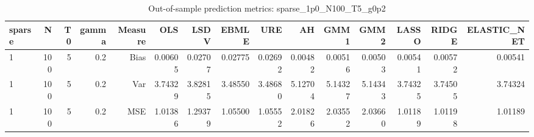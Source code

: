 \begin{table}[!htbp]\centering
\caption{Out-of-sample prediction metrics: sparse_1p0_N100_T5_g0p2}
\label{tab:table3_sparse_1p0_N100_T5_g0p2}
\begin{tabular}{lrrrrrrrrrrrrrr}
\hline
sparse & N & T0 & gamma & Measure & OLS & LSDV & EBMLE & URE & AH & GMM1 & GMM2 & LASSO & RIDGE & ELASTIC_NET \\
\hline
1 & 100 & 5 & 0.2 & Bias & 0.00605 & 0.02707 & 0.02775 & 0.02692 & 0.00482 & 0.00516 & 0.00503 & 0.00541 & 0.00572 & 0.00541 \\
1 & 100 & 5 & 0.2 & Var & 3.74329 & 3.82815 & 3.48550 & 3.48680 & 5.12704 & 5.14327 & 5.14343 & 3.74325 & 3.74505 & 3.74324 \\
1 & 100 & 5 & 0.2 & MSE & 1.01386 & 1.29379 & 1.05500 & 1.05552 & 2.01826 & 2.03552 & 2.03660 & 1.01189 & 1.01198 & 1.01189 \\
\hline
\end{tabular}
\end{table}


